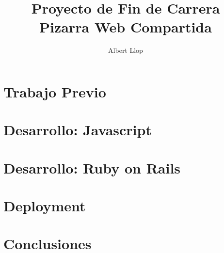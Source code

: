 \documentclass [11pt]{report}
\begin{document}
\author{Albert Llop}
\title{\Huge{\textbf{Proyecto de Fin de Carrera} \\ Pizarra Web Compartida}}
\maketitle
\newpage
\tableofcontents

\chapter{Trabajo Previo}

\newpage

\newpage

\newpage



\chapter{Desarrollo: Javascript}

\newpage

\newpage

\newpage




\chapter{Desarrollo: Ruby on Rails}

\newpage

\newpage

\newpage

\newpage

\newpage

\newpage



\chapter{Deployment}

\newpage

\newpage



\chapter{Conclusiones}

\newpage

\newpage

\newpage
\end{document}
